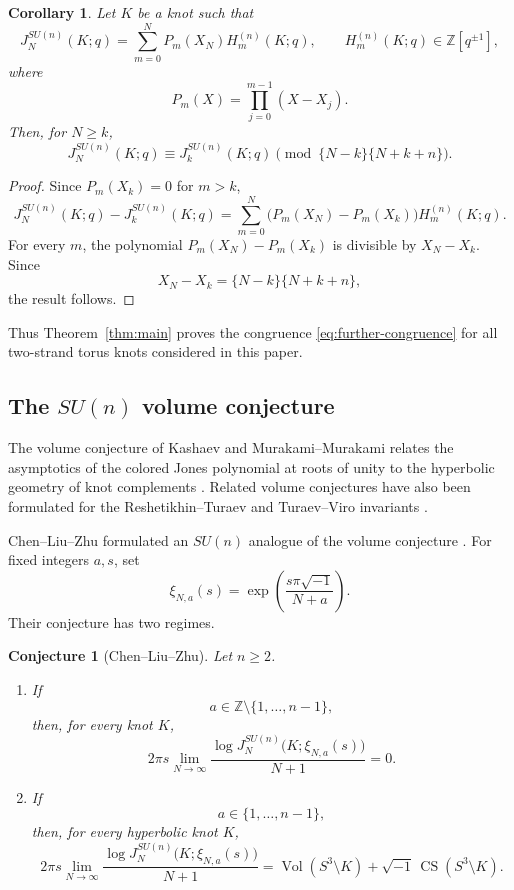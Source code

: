 \documentclass[11pt]{amsart}
\newtheorem{corollary}[theorem]{Corollary}
\newtheorem{conjecture}[theorem]{Conjecture}
\newcommand{\Z}{\mathbb Z}
\begin{document}
\begin{corollary}\label{cor:further-congruence}
Let \(K\) be a knot such that
\[
J_N^{SU(n)}(K;q)
=
\sum_{m=0}^{N}
P_m(X_N)H_m^{(n)}(K;q),
\qquad
H_m^{(n)}(K;q)\in\Z[q^{\pm1}],
\]
where
\[
P_m(X)=\prod_{j=0}^{m-1}(X-X_j).
\]
Then, for \(N\geq k\),
\begin{equation}\label{eq:further-congruence}
J_N^{SU(n)}(K;q)
\equiv
J_k^{SU(n)}(K;q)
\pmod{\{N-k\}\{N+k+n\}}.
\end{equation}
\end{corollary}

\begin{proof}
Since \(P_m(X_k)=0\) for \(m>k\),
\[
J_N^{SU(n)}(K;q)-J_k^{SU(n)}(K;q)
=
\sum_{m=0}^{N}
\bigl(P_m(X_N)-P_m(X_k)\bigr)
H_m^{(n)}(K;q).
\]
For every \(m\), the polynomial
\(P_m(X_N)-P_m(X_k)\) is divisible by \(X_N-X_k\).  Since
\[
X_N-X_k
=
\{N-k\}\{N+k+n\},
\]
the result follows.
\end{proof}

Thus Theorem~\ref{thm:main} proves the congruence \eqref{eq:further-congruence} for all two-strand torus knots considered in this paper.

\subsection{The \(SU(n)\) volume conjecture}

The volume conjecture of Kashaev and Murakami--Murakami relates the
asymptotics of the colored Jones polynomial at roots of unity to the hyperbolic geometry of knot complements
\cite{Kashaev,MurakamiMurakami}.  Related volume conjectures have also
been formulated for the Reshetikhin--Turaev and Turaev--Viro invariants
\cite{ChenYang}.

Chen--Liu--Zhu formulated an \(SU(n)\) analogue of the volume
conjecture \cite{CLZ}.  For fixed integers \(a,s\), set
\[
\xi_{N,a}(s)
=
\exp\left(
\frac{s\pi\sqrt{-1}}{N+a}
\right).
\]
Their conjecture has two regimes.

\begin{conjecture}[Chen--Liu--Zhu]\label{conj:SU-n-volume}
Let \(n\geq2\).

\begin{enumerate}
\item[(i)]
If
\[
a\in\mathbb Z\setminus\{1,\ldots,n-1\},
\]
then, for every knot \(K\),
\[
2\pi s
\lim_{N\to\infty}
\frac{
\log J_N^{SU(n)}
\bigl(K;\xi_{N,a}(s)\bigr)
}{
N+1
}
=
0.
\]

\item[(ii)]
If
\[
a\in\{1,\ldots,n-1\},
\]
then, for every hyperbolic knot \(K\),
\[
2\pi s
\lim_{N\to\infty}
\frac{
\log J_N^{SU(n)}
\bigl(K;\xi_{N,a}(s)\bigr)
}{
N+1
}
=
\operatorname{Vol}(S^3\setminus K)
+
\sqrt{-1}\,
\operatorname{CS}(S^3\setminus K).
\]
\end{enumerate}
\end{conjecture}
\end{document}
